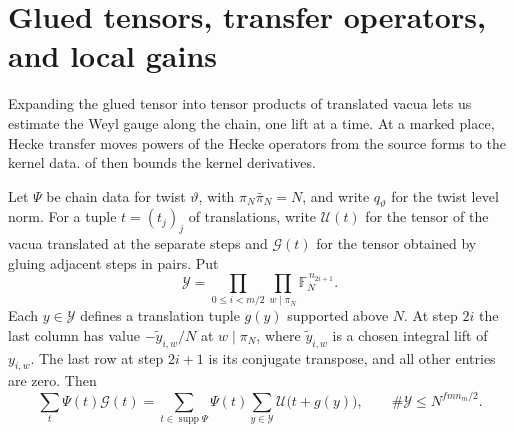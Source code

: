 \section{Glued tensors, transfer operators, and local gains}
\label{sec:a-local-divisibility}

Expanding the glued tensor into tensor products of translated vacua lets us estimate the Weyl gauge along the chain, one lift at a time. At a marked place, Hecke transfer moves powers of the Hecke operators from the source forms to the kernel data.  of  then bounds the kernel derivatives.

\begin{lemma}
\label{lem:a-glued-translate-expansion}
\emitthmsource
Let $\Psi$ be chain data for twist $\vartheta$, with $\pi_N\bar\pi_N=N$, and write $q_\vartheta$ for the twist level norm. For a tuple $t=(t_j)_j$ of translations, write $\mathcal U(t)$ for the tensor of the vacua translated at the separate steps and $\mathcal G(t)$ for the tensor obtained by gluing adjacent steps in pairs. Put
\[
 \mathcal Y=\prod_{0\le i<m/2}\prod_{w\mid\pi_N}
                \mathbb F_N^{\,n_{2i+1}}.
\]
Each $y\in\mathcal Y$ defines a translation tuple $g(y)$ supported above $N$. At step $2i$ the last column has value $-\widetilde y_{i,w}/N$ at $w\mid\pi_N$, where $\widetilde y_{i,w}$ is a chosen integral lift of $y_{i,w}$. The last row at step $2i+1$ is its conjugate transpose, and all other entries are zero. Then
\[
 \sum_t\Psi(t)\mathcal G(t)
  =\sum_{t\in\operatorname{supp}\Psi}\Psi(t)
     \sum_{y\in\mathcal Y}\mathcal U\bigl(t+g(y)\bigr),
 \qquad
 \#\mathcal Y\le N^{fmn_m/2}.
\]
\end{lemma}
